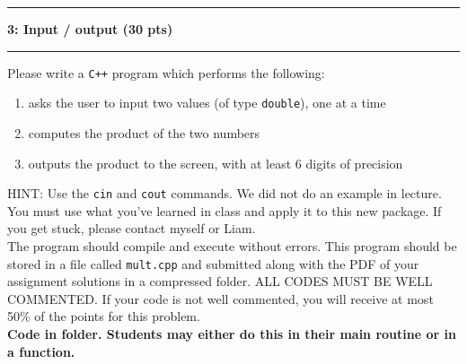 \documentclass[11pt]{article}
\newcommand\question[2]{\vspace{.25in}\hrule\textbf{#1: #2}\vspace{.5em}\hrule\vspace{.10in}}
\begin{document}
\newpage
\question{3}{Input / output (30 pts)}
Please write a \texttt{C++} program which performs the following:
\begin{enumerate}
    \item asks the user to input two values (of type \texttt{double}), one at a
        time
    \item computes the product of the two numbers
    \item outputs the product to the screen, with at least 6 digits of
        precision
\end{enumerate}
HINT: Use the \texttt{cin} and \texttt{cout} commands. We did not do an example in lecture. You must use what you've learned in class and apply it to this new package. If you get stuck, please contact myself or Liam. \\
\vspace{8pt} 
The program should compile and execute without errors. This program
should be stored in a file called \texttt{mult.cpp} and submitted along with the PDF of your assignment solutions in a compressed folder. ALL CODES MUST BE WELL COMMENTED. If your code is not well commented, you will receive at most 50\% of the points for this problem.\\
\vspace{10pt}
\textbf{Code in folder. Students may either do this in their main routine or in a function.} \\
\end{document}
